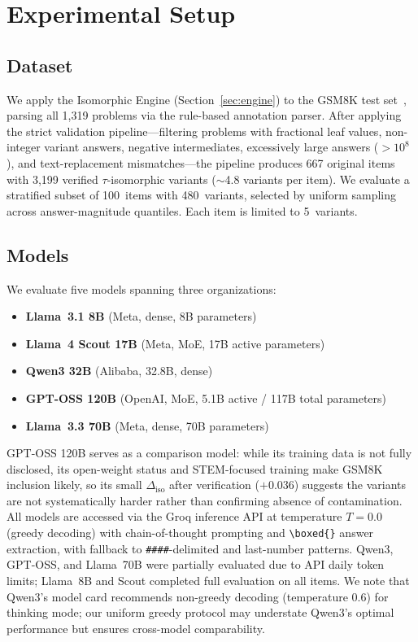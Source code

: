 
\section{Experimental Setup}
\label{sec:setup}

\subsection{Dataset}
We apply the Isomorphic Engine (Section~\ref{sec:engine}) to the
GSM8K test set~\cite{cobbe2021gsm8k}, parsing all 1{,}319 problems
via the rule-based annotation parser. After applying the strict
validation pipeline---filtering problems with fractional leaf values,
non-integer variant answers, negative intermediates, excessively large
answers ($>10^8$), and text-replacement mismatches---the pipeline
produces 667 original items with 3{,}199 verified $\tau$-isomorphic
variants ($\sim$4.8 variants per item). We evaluate a stratified
subset of 100~items with 480~variants, selected by uniform sampling
across answer-magnitude quantiles. Each item is limited to
5~variants.

\subsection{Models}
We evaluate five models spanning three organizations:

\begin{itemize}[nosep, leftmargin=*]
\item \textbf{Llama~3.1 8B} (Meta, dense, 8B parameters)
\item \textbf{Llama~4 Scout 17B} (Meta, MoE, 17B active parameters)
\item \textbf{Qwen3 32B} (Alibaba, 32.8B, dense)
\item \textbf{GPT-OSS 120B} (OpenAI, MoE, 5.1B active / 117B total parameters)
\item \textbf{Llama~3.3 70B} (Meta, dense, 70B parameters)
\end{itemize}

\noindent GPT-OSS 120B serves as a comparison model: while its
training data is not fully disclosed, its open-weight status and
STEM-focused training make GSM8K inclusion likely, so its small
$\Delta_{\mathrm{iso}}$ after verification ($+0.036$) suggests the
variants are not systematically harder rather than confirming absence
of contamination. All models are accessed via the Groq inference API
at temperature $T = 0.0$ (greedy decoding) with chain-of-thought
prompting and \verb|\boxed{}| answer extraction, with fallback to
\verb|####|-delimited and last-number patterns.
Qwen3, GPT-OSS, and Llama~70B were partially evaluated due to API
daily token limits; Llama~8B and Scout completed full evaluation on
all items.
We note that Qwen3's model card recommends non-greedy decoding
(temperature 0.6) for thinking mode; our uniform greedy protocol may
understate Qwen3's optimal performance but ensures cross-model
comparability.

